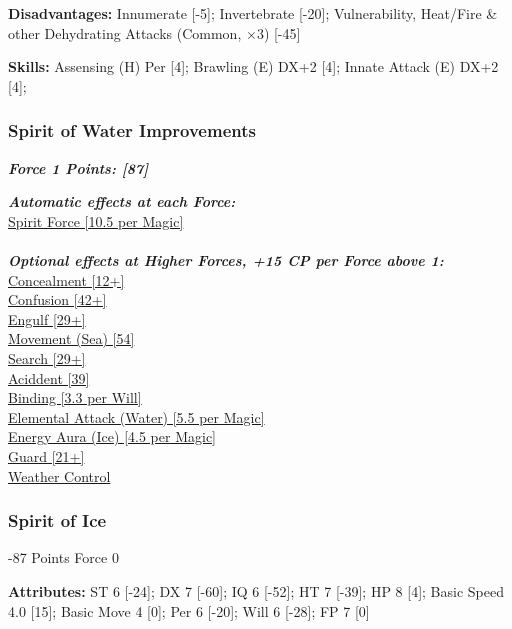 \begin{multicols}{3}
	\textbf{Disadvantages:}
	Innumerate [-5]; Invertebrate [-20]; Vulnerability, Heat/Fire \& other Dehydrating Attacks (Common, \(\times3\)) [-45]
	
	\textbf{Skills:}
	Assensing (H) Per [4]; Brawling (E) DX+2 [4]; Innate Attack (E) DX+2 [4];
	
	\subsubsection*{Spirit of Water Improvements}
	
	\textbf{\textit{Force 1 Points: [87]}}
	
	\textbf{\textit{Automatic effects at each Force:\\}}
	\hyperref[spirit_force]{Spirit Force [10.5 per Magic]}\\\\
	
	\textbf{\textit{Optional effects at Higher Forces, +15 CP per Force above 1:\\}}
	\hyperref[concealment]{Concealment [12+]}\\
	\hyperref[confusion]{Confusion [42+]}\\
	\hyperref[engulf]{Engulf [29+]}\\
	\hyperref[movement]{Movement (Sea) [54]}\\
	\hyperref[search]{Search [29+]}\\
	\hyperref[accident]{Aciddent [39]}\\
	\hyperref[binding]{Binding [3.3 per Will]}\\
	\hyperref[elemental_attack]{Elemental Attack (Water) [5.5 per Magic]}\\
	\hyperref[energy_aura]{Energy Aura (Ice) [4.5 per Magic]}\\
	\hyperref[guard]{Guard [21+]}\\
	\hyperref[weather_control]{Weather Control}\\
	
	
	\subsubsection*{Spirit of Ice}
	\begin{flushright}
		-87 Points Force 0
	\end{flushright}
	
	\textbf{Attributes:}
	ST 6 [-24]; DX 7 [-60]; IQ 6 [-52]; HT 7 [-39]; HP 8 [4]; Basic Speed 4.0 [15]; Basic Move 4 [0]; Per 6 [-20]; Will 6 [-28]; FP 7 [0]
	

\end{multicols}
